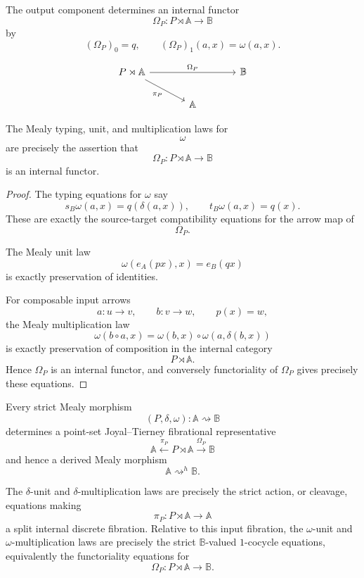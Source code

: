 The output component determines an internal functor
\[
\Omega_P:P\rtimes\mathbb A\to\mathbb B
\]
by
\[
(\Omega_P)_0=q,
\qquad
(\Omega_P)_1(a,x)=\omega(a,x).
\]

\[
\begin{tikzcd}[column sep=large]
P\rtimes\mathbb A
\arrow[dr, "\pi_P"']
\arrow[rr, "\Omega_P"]
&
&
\mathbb B
\\
&
\mathbb A
&
\end{tikzcd}
\]

\begin{proposition}
\label{prop:omega-output-functor-rewritten}
The Mealy typing, unit, and multiplication laws for
\[
\omega
\]
are precisely the assertion that
\[
\Omega_P:P\rtimes\mathbb A\to\mathbb B
\]
is an internal functor.
\end{proposition}

\begin{proof}
The typing equations for \(\omega\) say
\[
s_B\omega(a,x)=q(\delta(a,x)),
\qquad
t_B\omega(a,x)=q(x).
\]
These are exactly the source-target compatibility equations for the
arrow map of
\[
\Omega_P.
\]

The Mealy unit law
\[
\omega(e_A(px),x)=e_B(qx)
\]
is exactly preservation of identities.

For composable input arrows
\[
a:u\to v,
\qquad
b:v\to w,
\qquad
p(x)=w,
\]
the Mealy multiplication law
\[
\omega(b\circ a,x)
=
\omega(b,x)\circ\omega(a,\delta(b,x))
\]
is exactly preservation of composition in the internal category
\[
P\rtimes\mathbb A.
\]
Hence \(\Omega_P\) is an internal functor, and conversely functoriality
of \(\Omega_P\) gives precisely these equations.
\end{proof}

\begin{theorem}
\label{thm:strict-mealy-as-split-discrete-fibration-representatives-rewritten}
Every strict Mealy morphism
\[
(P,\delta,\omega):\mathbb A\rightsquigarrow\mathbb B
\]
determines a point-set Joyal--Tierney fibrational representative
\[
\mathbb A
\xleftarrow{\pi_P}
P\rtimes\mathbb A
\xrightarrow{\Omega_P}
\mathbb B
\]
and hence a derived Mealy morphism
\[
\mathbb A\rightsquigarrow^h\mathbb B.
\]

The \(\delta\)-unit and \(\delta\)-multiplication laws are precisely the
strict action, or cleavage, equations making
\[
\pi_P:P\rtimes\mathbb A\to\mathbb A
\]
a split internal discrete fibration. Relative to this input fibration,
the \(\omega\)-unit and \(\omega\)-multiplication laws are precisely the
strict \(\mathbb B\)-valued \(1\)-cocycle equations, equivalently the
functoriality equations for
\[
\Omega_P:P\rtimes\mathbb A\to\mathbb B.
\]
\end{theorem}


